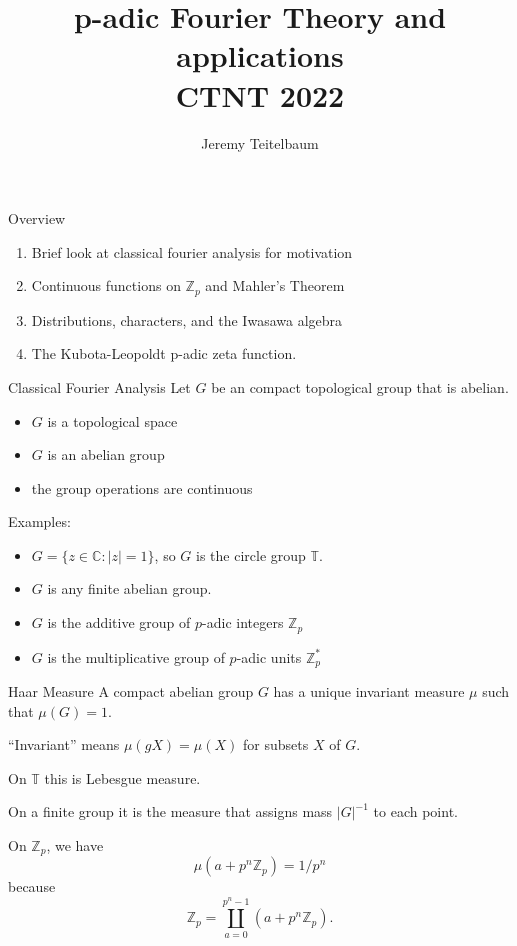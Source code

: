 \documentclass[
  ignorenonframetext,
]{beamer}
\title{p-adic Fourier Theory and applications\\
CTNT 2022}
\author{Jeremy Teitelbaum}
\date{}
\providecommand{\tightlist}{%
  \setlength{\itemsep}{0pt}\setlength{\parskip}{0pt}}
\begin{document}
\frame{\titlepage}

\begin{frame}{Overview}
\protect\hypertarget{overview}{}
\begin{enumerate}
\tightlist
\item
  Brief look at classical fourier analysis for motivation
\item
  Continuous functions on \(\mathbb{Z}_p\) and Mahler's Theorem
\item
  Distributions, characters, and the Iwasawa algebra
\item
  The Kubota-Leopoldt p-adic zeta function.
\end{enumerate}
\end{frame}

\begin{frame}{Classical Fourier Analysis}
\protect\hypertarget{classical-fourier-analysis}{}
Let \(G\) be an compact topological group that is abelian.

\begin{itemize}
\tightlist
\item
  \(G\) is a topological space
\item
  \(G\) is an abelian group
\item
  the group operations are continuous
\end{itemize}

Examples:

\begin{itemize}
\tightlist
\item
  \(G=\{z\in\mathbb{C}: |z|=1\}\), so \(G\) is the circle group
  \(\mathbb{T}\).
\item
  \(G\) is any finite abelian group.
\item
  \(G\) is the additive group of \(p\)-adic integers \(\mathbb{Z}_{p}\)
\item
  \(G\) is the multiplicative group of \(p\)-adic units
  \(\mathbb{Z}_{p}^{*}\)
\end{itemize}
\end{frame}

\begin{frame}{Haar Measure}
\protect\hypertarget{haar-measure}{}
A compact abelian group \(G\) has a unique invariant measure \(\mu\)
such that \(\mu(G)=1\).

``Invariant'' means \(\mu(gX)=\mu(X)\) for subsets \(X\) of \(G\).

On \(\mathbb{T}\) this is Lebesgue measure.

On a finite group it is the measure that assigns mass \(|G|^{-1}\) to
each point.

On \(\mathbb{Z}_{p}\), we have \[
\mu(a+p^{n}\mathbb{Z}_{p})=1/p^{n}
\] because
\[\mathbb{Z}_{p}=\coprod_{a=0}^{p^{n}-1} (a+p^{n}\mathbb{Z}_{p}).\]
\end{frame}
\end{document}
